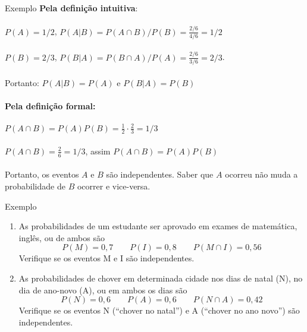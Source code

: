 \documentclass[10pt]{beamer}\usepackage[]{graphicx}\usepackage[]{color}
\theoremstyle{definition}
\begin{document}
\begin{frame}{Exemplo}
  \textbf{Pela definição intuitiva}: \\~\\
  $P(A) = 1/2$, \quad $P(A|B) = P(A\cap B)/P(B) = \frac{2/6}{4/6} =
  1/2$ \\~\\
  $P(B) = 2/3$, \quad $P(B|A) = P(B\cap A)/P(A) = \frac{2/6}{3/6} =
  2/3$. \\~\\
  Portanto: $P(A|B) = P(A)$ e $P(B|A) = P(B)$ \\~\\
  \textbf{Pela definição formal:} \\~\\
  $P(A \cap B) = P(A)P(B) = \frac{1}{2} \cdot \frac{2}{3} = 1/3$ \\~\\
  $P(A \cap B) = \frac{2}{6} = 1/3$, assim $P(A \cap B) = P(A)P(B)$ \\~\\
  Portanto, os eventos $A$ e $B$ são independentes. Saber que $A$
  ocorreu não muda a probabilidade de $B$ ocorrer e vice-versa.
\end{frame}

\begin{frame}{Exemplo}
  \begin{enumerate}
  \item As probabilidades de um estudante ser aprovado em exames de
    matemática, inglês, ou de ambos são
    \begin{equation*}
      P(M) = 0,7 \qquad P(I) = 0,8 \qquad P(M \cap I) = 0,56
    \end{equation*}
    Verifique se os eventos M e I são independentes.
  \item As probabilidades de chover em determinada cidade nos
    dias de natal (N), no dia de ano-novo (A), ou em ambos os dias são
    \begin{equation*}
      P(N) = 0,6 \qquad P(A) = 0,6 \qquad P(N \cap A) = 0,42
    \end{equation*}
    Verifique se os eventos N (``chover no natal'') e A (``chover no ano
    novo'') são independentes.
  \end{enumerate}
\end{frame}

\end{document}

